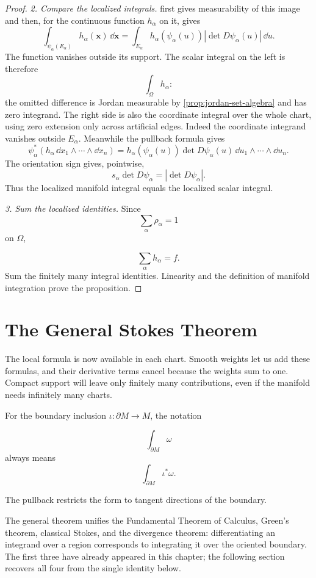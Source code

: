 \begin{proof}
\emph{2. Compare the localized integrals.}
 first gives measurability of this image
and then, for the continuous function $h_\alpha$ on it, gives
\[
\int_{\psi_\alpha(E_\alpha)}h_\alpha(\mathbf{x})\,\dd\mathbf{x}
=\int_{E_\alpha}h_\alpha(\psi_\alpha(u))
       |\det D\psi_\alpha(u)|\,\dd u.
\]
The function vanishes outside its support. The scalar integral on the left
is therefore
\[
\int_\Omega h_\alpha:
\]
 the omitted difference is Jordan
measurable by \cref{prop:jordan-set-algebra} and has zero integrand.
The right side is also the coordinate integral over the whole chart,
using zero extension only across artificial edges. Indeed the coordinate
integrand vanishes outside $E_\alpha$. Meanwhile the pullback formula gives
\[
\psi_\alpha^*(h_\alpha\,\dd x_1\wedge\cdots\wedge\dd x_n)
=h_\alpha(\psi_\alpha(u))\det D\psi_\alpha(u)\,
 \dd u_1\wedge\cdots\wedge\dd u_n.
\]
The orientation sign gives, pointwise,
\[
s_\alpha\det D\psi_\alpha=|\det D\psi_\alpha|.
\]
Thus the localized manifold integral equals the localized scalar integral.

\emph{3. Sum the localized identities.}
Since
\[
\sum_\alpha\rho_\alpha=1
\]
 on $\Omega$,

\[
\sum_\alpha h_\alpha=f.
\]
 Sum the finitely many integral identities.
Linearity and the definition of manifold integration prove the proposition.
\end{proof}

\section{The General Stokes Theorem}

The local formula is now available in each chart. Smooth weights let us
add these formulas, and their derivative terms cancel because the weights
sum to one. Compact support will leave only finitely many contributions,
even if the manifold needs infinitely many charts.

For the boundary inclusion $\iota:\partial M\to M$, the notation

\[
\int_{\partial M}\omega
\]
 always means
\[
\int_{\partial M}\iota^*\omega.
\]

The pullback restricts the form to tangent directions of the boundary.

The general theorem unifies the Fundamental Theorem of Calculus, Green's
theorem, classical Stokes, and the divergence theorem: differentiating an
integrand over a region corresponds to integrating it over the oriented
boundary. The first three have already appeared in this chapter; the
following section recovers all four from the single identity below.

